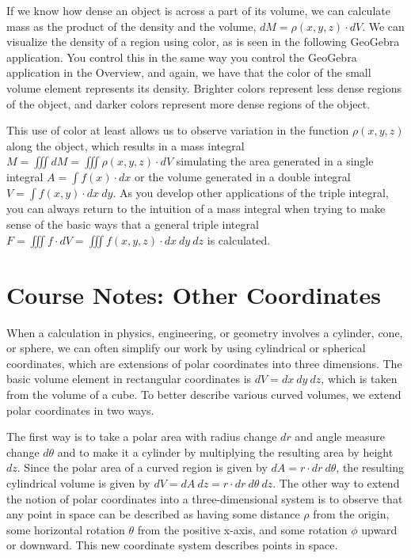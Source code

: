 \documentclass{ximera}
\begin{document}
If we know how dense an object is across a part of its volume, we can calculate mass as the product of the density and the volume, $dM=\rho(x,y,z)\cdot dV$. We can visualize the density of a region using color, as is seen in the following GeoGebra application. You control this in the same way you control the GeoGebra application in the Overview, and again, we have that the color of the small volume element represents its density. Brighter colors represent less dense regions of the object, and darker colors represent more dense regions of the object.

\begin{center}
\end{center}

This use of color at least allows us to observe variation in the function $\rho(x,y,z)$ along the object, which results in a mass integral $M=\iiint dM=\iiint \rho(x,y,z)\cdot dV$ simulating the area generated in a single integral $A=\int f(x)\cdot dx$ or the volume generated in a double integral $V=\int f(x,y)\cdot dx\ dy$. As you develop other applications of the triple integral, you can always return to the intuition of a mass integral when trying to make sense of the basic ways that a general triple integral $F=\iiint f\cdot dV=\iiint f(x,y,z)\cdot dx\ dy\ dz$ is calculated.


\section{Course Notes: Other Coordinates}

When a calculation in physics, engineering, or geometry involves a cylinder, cone, or sphere, we can often simplify our work by using cylindrical or spherical coordinates, which are extensions of polar coordinates into three dimensions. The basic volume element in rectangular coordinates is $dV=dx\ dy\ dz$, which is taken from the volume of a cube. To better describe various curved volumes, we extend polar coordinates in two ways.

The first way is to take a polar area with radius change $dr$ and angle measure change $d\theta$ and to make it a cylinder by multiplying the resulting area by height $dz$. Since the polar area of a curved region is given by $dA=r \cdot dr\ d\theta$, the resulting cylindrical volume is given by $dV=dA\ dz=r\cdot dr\ d\theta\ dz$. The other way to extend the notion of polar coordinates into a three-dimensional system is to observe that any point in space can be described as having some distance $\rho$ from the origin, some horizontal rotation $\theta$ from the positive x-axis, and some rotation $\phi$ upward or downward. This new coordinate system describes points in space.
\end{document}
